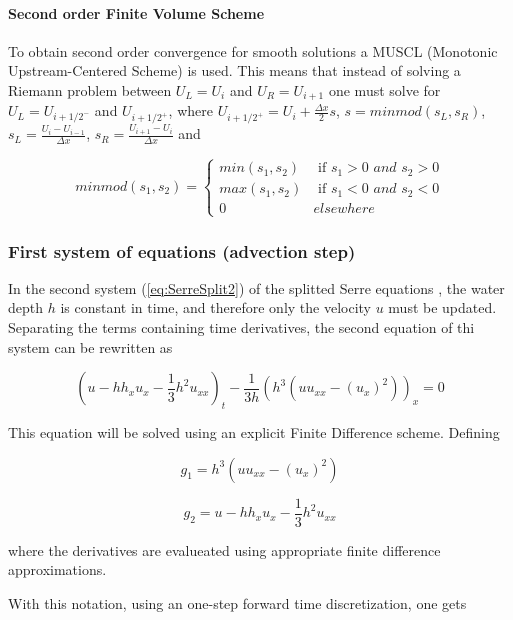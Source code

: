 \paragraph{Second order Finite Volume Scheme}

To obtain second order convergence for smooth solutions a MUSCL (Monotonic Upstream-Centered Scheme) is used. This means that instead of solving a Riemann problem between $U_L=U_{i}$ and $U_R=U_{i+1}$ one must solve for $U_L = U_{i+1/2^-}$ and $U_{i+1/2^+}$, where $U_{i+1/2^+} = U_i + \frac{\Delta x}{2} s$,  $s = minmod(s_L,s_R)$, 
$s_L = \frac{U_{i}-U_{i-1}}{\Delta x}$, 
$s_R = \frac{U_{i+1}-U_{i}}{\Delta x}$ and

\begin{equation}
	minmod(s_1,s_2) = \begin{cases}
		min(s_1,s_2) & \text{ if } s_1>0 \textit{ and } s_2>0 \\
		max(s_1,s_2) & \text{ if } s_1<0 \textit{ and } s_2<0 \\
		0 & elsewhere
	\end{cases}
\end{equation}

\subsubsection{First system of equations (advection step)}

\indent In the second system (\ref{eq:SerreSplit2}) of the splitted Serre equations , the water depth $h$ is constant in time, and therefore only the velocity $u$ must be updated. Separating the terms containing time derivatives, the second equation of thi system can be rewritten as

\begin{equation}
\label{eq:dispersive}
\left( u - hh_xu_x - \frac{1}{3}h^2u_{xx} \right)_t  - \frac{1}{3h}\left(h^3 \left( uu_{xx} - (u_x)^2  \right) \right)_x = 0
\end{equation}

\indent This equation will be solved using an explicit Finite Difference scheme. Defining

$$g_1 = h^3 \left( uu_{xx} - (u_x)^2 \right)$$

$$g_2 = u - h h_x u_x - \frac{1}{3}h^2 u_{xx}$$

\noindent where the derivatives are evalueated using appropriate finite difference approximations.

\indent With this notation, using an one-step forward time discretization, one gets

